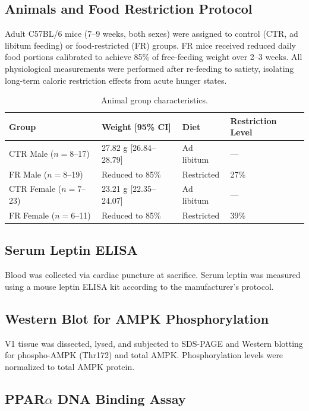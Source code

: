 \documentclass[11pt]{article}
\begin{document}
\subsection{Animals and Food Restriction Protocol}

Adult C57BL/6 mice (7--9 weeks, both sexes) were assigned to control (CTR, ad libitum feeding) or food-restricted (FR) groups. FR mice received reduced daily food portions calibrated to achieve 85\% of free-feeding weight over 2--3 weeks. All physiological measurements were performed after re-feeding to satiety, isolating long-term caloric restriction effects from acute hunger states.

\begin{table}[h]
\centering
\caption{Animal group characteristics.}
\label{tab:animals}
\begin{tabular}{llll}
\toprule
Group & Weight [95\% CI] & Diet & Restriction Level \\
\midrule
CTR Male ($n = 8$--17) & 27.82 g [26.84--28.79] & Ad libitum & --- \\
FR Male ($n = 8$--19) & Reduced to 85\% & Restricted & 27\% \\
CTR Female ($n = 7$--23) & 23.21 g [22.35--24.07] & Ad libitum & --- \\
FR Female ($n = 6$--11) & Reduced to 85\% & Restricted & 39\% \\
\bottomrule
\end{tabular}
\end{table}

\subsection{Serum Leptin ELISA}

Blood was collected via cardiac puncture at sacrifice. Serum leptin was measured using a mouse leptin ELISA kit according to the manufacturer's protocol.

\subsection{Western Blot for AMPK Phosphorylation}

V1 tissue was dissected, lysed, and subjected to SDS-PAGE and Western blotting for phospho-AMPK (Thr172) and total AMPK. Phosphorylation levels were normalized to total AMPK protein.

\subsection{PPAR$\alpha$ DNA Binding Assay}
\end{document}
